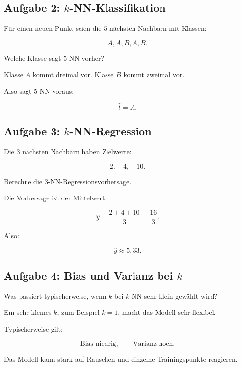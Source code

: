 \subsection{Aufgabe 2: \(k\)-NN-Klassifikation}

Für einen neuen Punkt seien die \(5\) nächsten Nachbarn mit Klassen:

\[
    A,A,B,A,B.
\]

Welche Klasse sagt \(5\)-NN vorher?

\begin{examplebox}
Klasse \(A\) kommt dreimal vor.
Klasse \(B\) kommt zweimal vor.

Also sagt \(5\)-NN voraus:

\[
    \hat{t}=A.
\]
\end{examplebox}

\subsection{Aufgabe 3: \(k\)-NN-Regression}

Die \(3\) nächsten Nachbarn haben Zielwerte:

\[
    2,
    \quad
    4,
    \quad
    10.
\]

Berechne die \(3\)-NN-Regressionsvorhersage.

\begin{examplebox}
Die Vorhersage ist der Mittelwert:

\[
    \hat{y}
    =
    \frac{2+4+10}{3}
    =
    \frac{16}{3}.
\]

Also:

\[
    \hat{y}
    \approx
    5{,}33.
\]
\end{examplebox}

\subsection{Aufgabe 4: Bias und Varianz bei \(k\)}

Was passiert typischerweise, wenn \(k\) bei \(k\)-NN sehr klein gewählt wird?

\begin{examplebox}
Ein sehr kleines \(k\), zum Beispiel \(k=1\), macht das Modell sehr flexibel.

Typischerweise gilt:

\[
    \text{Bias niedrig},
    \qquad
    \text{Varianz hoch}.
\]

Das Modell kann stark auf Rauschen und einzelne Trainingspunkte reagieren.
\end{examplebox}

